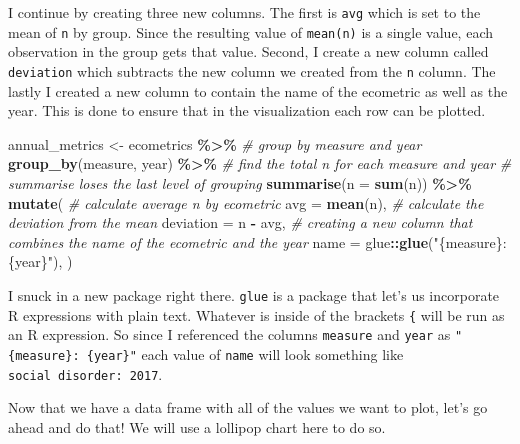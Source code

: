 \documentclass[
]{book}
\newenvironment{Shaded}{\begin{snugshade}}{\end{snugshade}}
\newcommand{\CommentTok}[1]{\textcolor[rgb]{0.56,0.35,0.01}{\textit{#1}}}
\newcommand{\DataTypeTok}[1]{\textcolor[rgb]{0.13,0.29,0.53}{#1}}
\newcommand{\KeywordTok}[1]{\textcolor[rgb]{0.13,0.29,0.53}{\textbf{#1}}}
\newcommand{\NormalTok}[1]{#1}
\newcommand{\OperatorTok}[1]{\textcolor[rgb]{0.81,0.36,0.00}{\textbf{#1}}}
\newcommand{\StringTok}[1]{\textcolor[rgb]{0.31,0.60,0.02}{#1}}
\begin{document}
I continue by creating three new columns. The first is \texttt{avg} which is set to the mean of \texttt{n} by group. Since the resulting value of \texttt{mean(n)} is a single value, each observation in the group gets that value. Second, I create a new column called \texttt{deviation} which subtracts the new column we created from the \texttt{n} column. The lastly I created a new column to contain the name of the ecometric as well as the year. This is done to ensure that in the visualization each row can be plotted.

\begin{Shaded}
\begin{Highlighting}[]
\NormalTok{annual\_metrics \textless{}{-}}\StringTok{ }\NormalTok{ecometrics }\OperatorTok{\%\textgreater{}\%}\StringTok{ }
\StringTok{  }\CommentTok{\# group by measure and year}
\StringTok{  }\KeywordTok{group\_by}\NormalTok{(measure, year) }\OperatorTok{\%\textgreater{}\%}\StringTok{ }
\StringTok{  }\CommentTok{\# find the total n for each measure and year}
\StringTok{  }\CommentTok{\# summarise loses the last level of grouping}
\StringTok{  }\KeywordTok{summarise}\NormalTok{(}\DataTypeTok{n =} \KeywordTok{sum}\NormalTok{(n)) }\OperatorTok{\%\textgreater{}\%}\StringTok{ }
\StringTok{  }\KeywordTok{mutate}\NormalTok{(}
    \CommentTok{\# calculate average \textasciigrave{}n\textasciigrave{} by ecometric}
    \DataTypeTok{avg =} \KeywordTok{mean}\NormalTok{(n),}
    \CommentTok{\# calculate the deviation from the mean }
    \DataTypeTok{deviation =}\NormalTok{ n }\OperatorTok{{-}}\StringTok{ }\NormalTok{avg,}
    \CommentTok{\# creating a new column that combines the name of the ecometric and the year}
    \DataTypeTok{name =}\NormalTok{ glue}\OperatorTok{::}\KeywordTok{glue}\NormalTok{(}\StringTok{"\{measure\}: \{year\}"}\NormalTok{),}
\NormalTok{  ) }
\end{Highlighting}
\end{Shaded}

I snuck in a new package right there. \texttt{glue} is a package that let's us incorporate R expressions with plain text. Whatever is inside of the brackets \texttt{\{} will be run as an R expression. So since I referenced the columns \texttt{measure} and \texttt{year} as \texttt{"\{measure\}:\ \{year\}"} each value of \texttt{name} will look something like \texttt{social\ disorder:\ 2017}.

Now that we have a data frame with all of the values we want to plot, let's go ahead and do that! We will use a lollipop chart here to do so.
\end{document}
